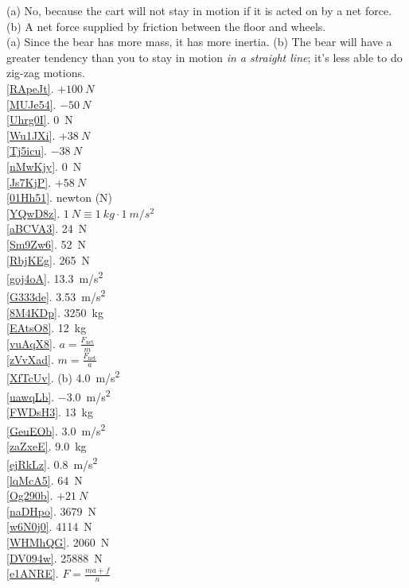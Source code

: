 \documentclass{article}
\begin{document}
\begin{multicols}{2}
(a) No, because the cart will not stay in motion if it is acted on by a net force. (b) A net force supplied by friction between the floor and wheels.\\
(a) Since the bear has more mass, it has more inertia. (b) The bear will have a greater tendency than you to stay in motion \textit{in a straight line}; it's less able to do zig-zag motions.\\
\ref{RApeJt}. $+\SI{100}{N}$\\
\ref{MUJe54}. $-\SI{50}{N}$\\
\ref{Uhrg0I}. \SI{0}{N}\\
\ref{Wu1JXi}. $+\SI{38}{N}$\\
\ref{Tj5icu}. $-\SI{38}{N}$\\
\ref{nMwKjy}. \SI{0}{N}\\
\ref{Js7KjP}. $+\SI{58}{N}$\\
\ref{01Hh51}. newton (N)\\
\ref{YQwD8z}. $\SI{1}{N} \equiv \SI{1}{kg} \cdot \SI{1}{m/s^2}$\\
\ref{aBCVA3}. \SI{24}{N}\\
\ref{Sm9Zw6}. \SI{52}{N}\\
\ref{RbjKEg}. \SI{265}{N}\\
\ref{goj4oA}. \SI{13.3}{m/s^2}\\
\ref{G333de}. \SI{3.53}{m/s^2}\\
\ref{8M4KDp}. \SI{3250}{kg}\\
\ref{EAtsO8}. \SI{12}{kg}\\
\ref{vuAqX8}. $a = \frac{F_{\text{net}}}{m}$\\
\ref{zVvXad}. $m = \frac{F_{\text{net}}}{a}$\\
\ref{XfTcUv}. (b) \SI{4.0}{m/s^2}\\
\ref{uawqLb}. \SI{-3.0}{m/s^2}\\
\ref{FWDsH3}. \SI{13}{kg}\\
\ref{GeuEOb}. \SI{3.0}{m/s^2}\\
\ref{zaZxeE}. \SI{9.0}{kg}\\
\ref{ejRkLz}. \SI{0.8}{m/s^2}\\
\ref{lqMcA5}. \SI{64}{N}\\
\ref{Og290b}. $+\SI{21}{N}$\\
\ref{naDHpo}. \SI{3679}{N}\\
\ref{w6N0j0}. \SI{4114}{N}\\
\ref{WHMhQG}. \SI{2060}{N}\\
\ref{DV094w}. \SI{25888}{N}\\
\ref{e1ANRE}. $F = \frac{ma + f}{n}$\\





\end{multicols}
\end{document}
